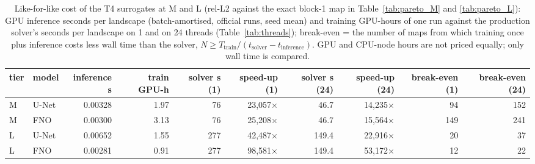 \begin{table}[tb]
\centering
\scriptsize
\setlength{\tabcolsep}{3.5pt}
\caption{Like-for-like cost of the T4 surrogates at M and L (rel-L2 against the exact block-1 map in Table~\ref{tab:pareto_M} and \ref{tab:pareto_L}): GPU inference seconds per landscape (batch-amortised, official runs, seed mean) and training GPU-hours of one run against the production solver's seconds per landscape on 1 and on 24 threads (Table~\ref{tab:threads}); break-even = the number of maps from which training once plus inference costs less wall time than the solver, $N \ge T_{\mathrm{train}} / (t_{\mathrm{solver}} - t_{\mathrm{inference}})$. GPU and CPU-node hours are not priced equally; only wall time is compared.}
\label{tab:breakeven}
\setlength{\tabcolsep}{2.2pt}
\begin{tabular}{llrrrrrrrr}
\toprule
tier & model & inference s & train GPU-h & solver s (1) & speed-up (1) & solver s (24) & speed-up (24) & break-even (1) & break-even (24) \\
\midrule
M & U-Net & 0.00328 & 1.97 & 76 & 23,057$\times$ & 46.7 & 14,235$\times$ & 94 & 152 \\
M & FNO & 0.00300 & 3.13 & 76 & 25,208$\times$ & 46.7 & 15,564$\times$ & 149 & 241 \\
L & U-Net & 0.00652 & 1.55 & 277 & 42,487$\times$ & 149.4 & 22,916$\times$ & 20 & 37 \\
L & FNO & 0.00281 & 0.91 & 277 & 98,581$\times$ & 149.4 & 53,172$\times$ & 12 & 22 \\
\bottomrule
\end{tabular}
\end{table}
